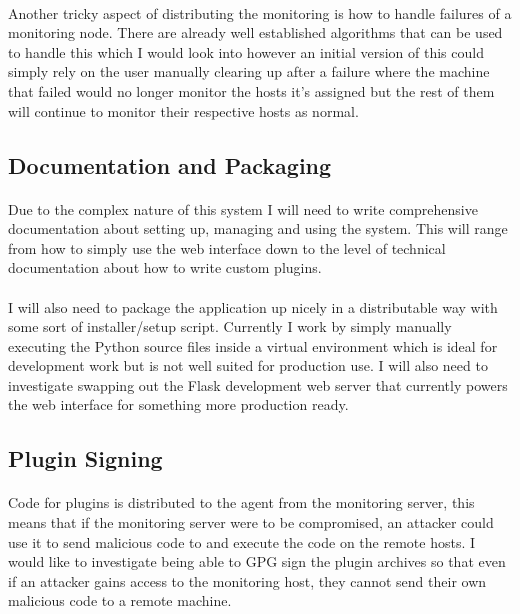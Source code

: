 \documentclass[bsc,logo,twoside]{infthesis}
\begin{document}
\paragraph*{}
	Another tricky aspect of distributing the monitoring is how to handle failures
	of a monitoring node.  There are already well established algorithms that can
	be used to handle this which I would look into however an initial version of
	this could simply rely on the user manually clearing up after a failure where
	the machine that failed would no longer monitor the hosts it's assigned but
	the rest of them will continue to monitor their respective hosts as normal.
	
\subsection{Documentation and Packaging}
\paragraph*{}
	Due to the complex nature of this system I will need to write comprehensive
	documentation about setting up, managing and using the system.  This will
	range from how to simply use the web interface down to the level of technical
	documentation about how to write custom plugins.
	
\paragraph*{}
	I will also need to package the application up nicely in a distributable way
	with some sort of installer/setup script.  Currently I work by simply manually
	executing the Python source files inside a virtual environment which is ideal
	for development work but is not well suited for production use.  I will also
	need to investigate swapping out the Flask development web server that
	currently powers the web interface for something more production ready.
	
\subsection{Plugin Signing}
\paragraph*{}
	Code for plugins is distributed to the agent from the monitoring server, this
	means that if the monitoring server were to be compromised, an attacker could
	use it to send malicious code to and execute the code on the remote hosts. I
	would like to investigate being able to GPG sign the plugin archives so that
	even if an attacker gains access to the monitoring host, they cannot send
	their own malicious code to a remote machine.	
	
\end{document}
